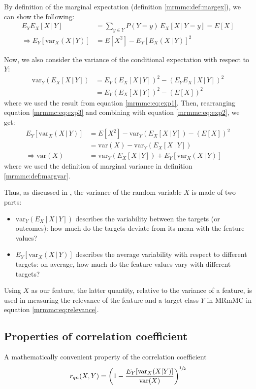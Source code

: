 \documentclass[12pt, twoside, a4paper]{report}
\def\var{\text{var}}
\begin{document}
By definition of the marginal expectation (definition \ref{mrmmc:def:margex}), we can show the following:
\begin{align}
E_YE_X[X \, | \, Y] &= \sum_{y \in Y} P(Y=y) \, E_X[X \, | \, Y=y] = E[X] \label{mrmmc:eq:exp1} \\
\Rightarrow E_Y [ \var_X(X \, | \, Y) ] &= E[X^2] - E_Y [ E_X(X\,|\,Y) ] ^2 \label{mrmmc:eq:exp2}
\end{align}

Now, we also consider the variance of the conditional expectation with respect to $Y$:
\begin{align}
\var_Y (E_X[X \, | \, Y]) &= E_Y \left( E_X[X \, | \, Y]\right)^2 - \left( E_YE_X[X \, | \, Y] \right)^2 \\
&= E_Y \left( E_X[X \, | \, Y]\right)^2 - \left( E[X] \right)^2 \label{mrmmc:eq:exp3}
\end{align}
where we used the result from equation \ref{mrmmc:eq:exp1}. Then, rearranging equation \ref{mrmmc:eq:exp3} and combining with equation \ref{mrmmc:eq:exp2}, we get:
\begin{align*}
E_Y [ \var_X(X \, | \, Y) ] &= E[X^2] - \var_Y (E_X[X \, | \, Y]) - \left( E[X] \right)^2 \\
&= \var(X) - \var_Y (E_X[X \, | \, Y]) \\
\Rightarrow \var(X) &= \var_Y (E_X[X \, | \, Y]) + E_Y [ \var_X(X \, | \, Y) ]
\end{align*}
where we used the definition of marginal variance in definition \ref{mrmmc:def:margvar}.

Thus, as discussed in \cite{RefWorks:187}, the variance of the random variable $X$ is made of two parts: 
\begin{itemize}
  \item $\var_Y (E_X[X \, | \, Y])$ describes the variability between the targets (or outcomes): how much do the targets deviate from its mean with the feature values?
  
  \item $E_Y [ \var_X(X \, | \, Y) ]$ describes the average variability with respect to different targets: on average, how much do the feature values vary with different targets?
\end{itemize}

Using $X$ as our feature, the latter quantity, relative to the variance of a feature, is used in measuring the relevance of the feature and a target class $Y$ in MRmMC in equation \ref{mrmmc:eq:relevance}.

\subsection{Properties of correlation coefficient}
A mathematically convenient property of the correlation coefficient
\begin{align*}
r_{qn}(X, Y) = \left( 1 - \frac{E_Y[\var_X(X|Y)]}{\var(X)} \right)^{\sfrac{1}{2}}
\end{align*}
\end{document}
